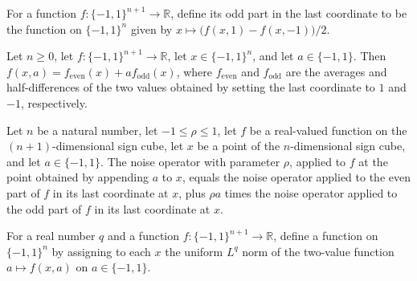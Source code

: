 \begin{definition}
\label{FABL.lastOddPart}
\leanok
For a function $f:\{-1,1\}^{n+1}\to\mathbb R$, define its odd part in the last
coordinate to be the function on $\{-1,1\}^n$ given by $x\mapsto
\bigl(f(x,1)-f(x,-1)\bigr)/2$.
\end{definition}

\begin{theorem}
\label{FABL.lastCoordinate_reconstruct}
\leanok
{}
Let $n\ge 0$, let $f:\{−1,1\}^{n+1}\to\mathbb R$, let $x\in\{−1,1\}^n$, and let
$a\in\{−1,1\}$. Then $f(x,a)=f_{\mathrm{even}}(x)+a f_{\mathrm{odd}}(x)$, where
$f_{\mathrm{even}}$ and $f_{\mathrm{odd}}$ are the averages and half-differences of the
two values obtained by setting the last coordinate to $1$ and $-1$, respectively.
\end{theorem}

\begin{theorem}
\label{FABL.noiseOperator_snoc}
\leanok
{}
Let $n$ be a natural number, let $-1\le\rho\le1$, let $f$ be a real-valued function on
the $(n+1)$-dimensional sign cube, let $x$ be a point of the $n$-dimensional sign cube,
and let $a\in\{ -1,1\}$. The noise operator with parameter $\rho$, applied to $f$ at the
point obtained by appending $a$ to $x$, equals the noise operator applied to the even
part of $f$ in its last coordinate at $x$, plus $\rho a$ times the noise operator
applied to the odd part of $f$ in its last coordinate at $x$.
\end{theorem}

\begin{definition}
\label{FABL.lastFiberLpNorm}
\leanok
{}
For a real number $q$ and a function $f:\{-1,1\}^{n+1}\to\mathbb R$, define a function
on $\{-1,1\}^n$ by assigning to each $x$ the uniform $L^q$ norm of the two-value
function $a\mapsto f(x,a)$ on $a\in\{-1,1\}$.
\end{definition}

